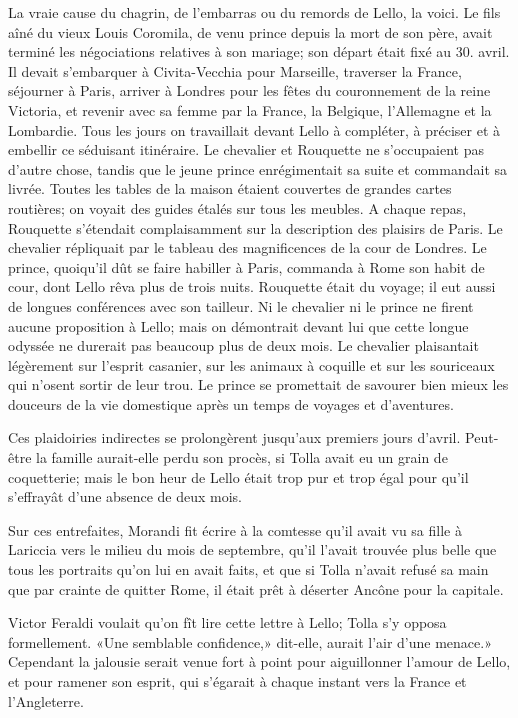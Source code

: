 La vraie cause du chagrin, de l'embarras ou du remords de Lello, la
voici. Le fils aîné du vieux Louis Coromila, de venu prince depuis la
mort de son père, avait terminé les négociations relatives à son
mariage; son départ était fixé au 30. avril. Il devait s'embarquer à
Civita-Vecchia pour Marseille, traverser la France, séjourner à Paris,
arriver à Londres pour les fêtes du couronnement de la reine Victoria,
et revenir avec sa femme par la France, la Belgique, l'Allemagne et la
Lombardie. Tous les jours on travaillait devant Lello à compléter, à
préciser et à embellir ce séduisant itinéraire. Le chevalier et
Rouquette ne s'occupaient pas d'autre chose, tandis que le jeune prince
enrégimentait sa suite et commandait sa livrée. Toutes les tables de la
maison étaient couvertes de grandes cartes routières; on voyait des
guides étalés sur tous les meubles. A chaque repas, Rouquette s'étendait
complaisamment sur la description des plaisirs de Paris. Le chevalier
répliquait par le tableau des magnificences de la cour de Londres. Le
prince, quoiqu'il dût se faire habiller à Paris, commanda à Rome son
habit de cour, dont Lello rêva plus de trois nuits. Rouquette était du
voyage; il eut aussi de longues conférences avec son tailleur. Ni le
chevalier ni le prince ne firent aucune proposition à Lello; mais on
démontrait devant lui que cette longue odyssée ne durerait pas beaucoup
plus de deux mois. Le chevalier plaisantait légèrement sur l'esprit
casanier, sur les animaux à coquille et sur les souriceaux qui n'osent
sortir de leur trou. Le prince se promettait de savourer bien mieux les
douceurs de la vie domestique après un temps de voyages et d'aventures.

Ces plaidoiries indirectes se prolongèrent jusqu'aux premiers jours
d'avril. Peut-être la famille aurait-elle perdu son procès, si Tolla
avait eu un grain de coquetterie; mais le bon heur de Lello était trop
pur et trop égal pour qu'il s'effrayât d'une absence de deux mois.

Sur ces entrefaites, Morandi fit écrire à la comtesse qu'il avait vu sa
fille à Lariccia vers le milieu du mois de septembre, qu'il l'avait
trouvée plus belle que tous les portraits qu'on lui en avait faits, et
que si Tolla n'avait refusé sa main que par crainte de quitter Rome, il
était prêt à déserter Ancône pour la capitale.

Victor Feraldi voulait qu'on fît lire cette lettre à Lello; Tolla s'y
opposa formellement. «Une semblable confidence,» dit-elle, aurait l'air
d'une menace.» Cependant la jalousie serait venue fort à point pour
aiguillonner l'amour de Lello, et pour ramener son esprit, qui s'égarait
à chaque instant vers la France et l'Angleterre.

